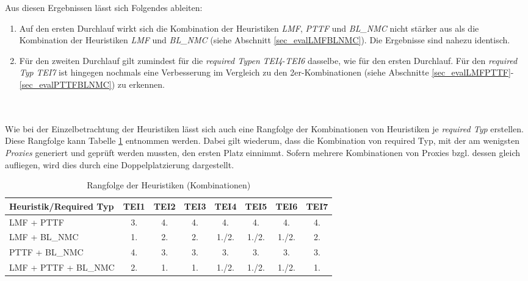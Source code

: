 \begin{multicols}{2}
\columnbreak
{}
\end{multicols}
\noindent
Aus diesen Ergebnissen lässt sich Folgendes ableiten:
\begin{enumerate}
\item Auf den ersten Durchlauf wirkt sich die Kombination der \Gls{Heuristik}en \emph{LMF}, \emph{PTTF} und \emph{BL\_NMC} nicht stärker aus als die Kombination der \Gls{Heuristik}en \emph{LMF} und \emph{BL\_NMC} (siehe Abschnitt \ref{sec_evalLMFBLNMC}). Die Ergebnisse sind nahezu identisch.


\item Für den zweiten Durchlauf gilt zumindest für die \emph{required Typen} \emph{TEI4}-\emph{TEI6} dasselbe, wie für den ersten Durchlauf. Für den \emph{required Typ} \emph{TEI7} ist hingegen nochmals eine Verbesserung im Vergleich zu den 2er-Kombinationen (siehe Abschnitte \ref{sec_evalLMFPTTF}-\ref{sec_evalPTTFBLNMC}) zu erkennen.
\end{enumerate}
\noindent
\\\\
Wie bei der Einzelbetrachtung der \Gls{Heuristik}en lässt sich auch eine Rangfolge der Kombinationen von \Gls{Heuristik}en je \emph{required Typ} erstellen. Diese Rangfolge kann Tabelle \ref{tab_rankingCombi} entnommen werden. Dabei gilt wiederum, dass die Kombination von required Typ, mit der am wenigsten \emph{Proxies} generiert und geprüft werden mussten, den ersten Platz einnimmt. Sofern mehrere Kombinationen von Proxies bzgl. dessen gleich aufliegen, wird dies durch eine Doppelplatzierung dargestellt.
\begin{table}[!h]
\centering
\begin{tabular}{|l|c|c|c|c|c|c|c|}
\hline
\hline
\textbf{Heuristik/Required Typ} & \textbf{TEI1} & \textbf{TEI2}& \textbf{TEI3}& \textbf{TEI4}& \textbf{TEI5}& \textbf{TEI6}& \textbf{TEI7}\\
\hline
\hline
LMF + PTTF &3.&4.&4.&4.&4.&4.&4.\\
\hline
LMF + BL\_NMC &1. &2.&2.&1./2.&1./2.&1./2.&2. \\
\hline
PTTF + BL\_NMC &4. &3.&3.&3.&3.&3.& 3.\\
\hline
LMF + PTTF + BL\_NMC &2. &1. &1. & 1./2.&1./2.&1./2.&1.\\
\hline
\hline
\end{tabular}
\caption{Rangfolge der Heuristiken (Kombinationen)}
\label{tab_rankingCombi}
\end{table}
